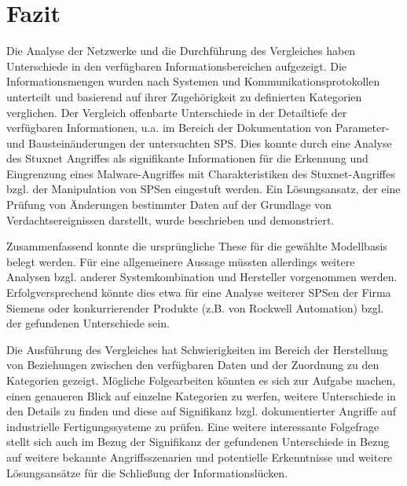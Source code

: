 \chapter{Fazit}
\label{cha:Fazit}

Die Analyse der Netzwerke und die Durchführung des Vergleiches haben Unterschiede in den verfügbaren Informationsbereichen aufgezeigt. Die Informationsmengen wurden nach Systemen und Kommunikationsprotokollen unterteilt und basierend auf ihrer Zugehörigkeit zu definierten Kategorien verglichen. Der Vergleich offenbarte Unterschiede in der Detailtiefe der verfügbaren Informationen, u.a. im Bereich der Dokumentation von Parameter- und Bausteinänderungen der untersuchten SPS. Dies konnte durch eine Analyse des Stuxnet Angriffes als signifikante Informationen für die Erkennung und Eingrenzung eines Malware-Angriffes mit Charakteristiken des Stuxnet-Angriffes bzgl. der Manipulation von SPSen eingestuft werden. Ein Lösungsansatz, der eine Prüfung von Änderungen bestimmter Daten auf der Grundlage von Verdachtsereignissen darstellt, wurde beschrieben und demonstriert. 

Zusammenfassend konnte die ursprüngliche These für die gewählte Modellbasis belegt werden. Für eine allgemeinere Aussage müssten allerdings weitere Analysen bzgl. anderer Systemkombination und Hersteller vorgenommen werden. Erfolgversprechend könnte dies etwa für eine Analyse weiterer SPSen der Firma Siemens oder konkurrierender Produkte (z.B. von Rockwell Automation) bzgl. der gefundenen Unterschiede sein. 

Die Ausführung des Vergleiches hat Schwierigkeiten im Bereich der Herstellung von Beziehungen zwischen den verfügbaren Daten und der Zuordnung zu den Kategorien gezeigt. Mögliche Folgearbeiten könnten es sich zur Aufgabe machen, einen genaueren Blick auf einzelne Kategorien zu werfen, weitere Unterschiede in den Details zu finden und diese auf Signifikanz bzgl. dokumentierter Angriffe auf industrielle Fertigungssysteme zu prüfen. 
Eine weitere interessante Folgefrage stellt sich auch im Bezug der Signifikanz der gefundenen Unterschiede in Bezug auf weitere bekannte Angriffsszenarien und potentielle Erkenntnisse und weitere Lösungsansätze für die Schließung der Informationslücken.


